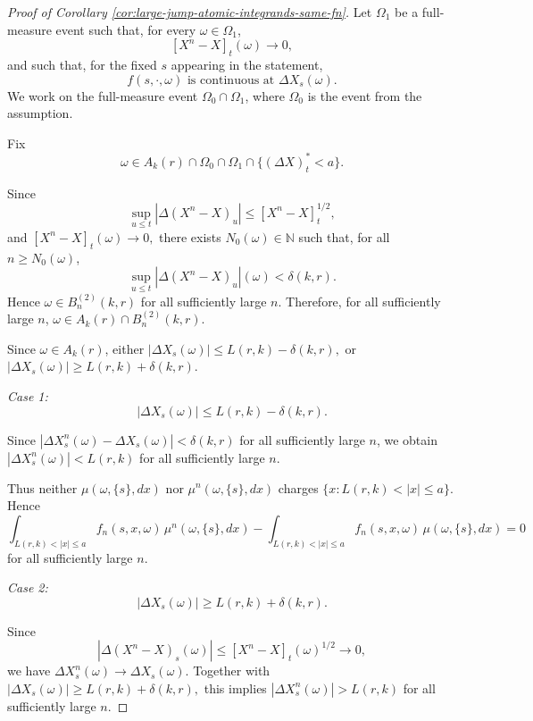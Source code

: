 \documentclass[a4paper,10pt]{article}
\begin{document}
\begin{proof}[Proof of Corollary \ref{cor:large-jump-atomic-integrands-same-fn}]
Let \(\Omega_1\) be a full-measure event such that, for every
\(\omega\in\Omega_1\),
\[
        [X^n-X]_t(\omega)\to0,
\]
and such that, for the fixed \(s\) appearing in the statement,
\[
        f(s,\cdot,\omega)
        \text{ is continuous at }\Delta X_s(\omega).
\]
We work on the full-measure event \(\Omega_0\cap\Omega_1\), where \(\Omega_0\)
is the event from the assumption.

Fix
\[
        \omega \in A_k(r)\cap \Omega_0\cap\Omega_1 \cap \{(\Delta X)^*_t<a\}.
\]

Since
\[
        \sup_{u\le t}|\Delta(X^{n}-X)_u|
        \le [X^{n}-X]_t^{1/2},
\]
and
$
        [X^{n}-X]_t(\omega)\to0,
$
there exists \(N_0(\omega)\in\mathbb N\) such that, for all
\(n\ge N_0(\omega)\),
\[
        \sup_{u\le t}
        |\Delta(X^{n}-X)_u|(\omega)
        <\delta(k,r).
\]
Hence
$
        \omega\in B_n^{(2)}(k,r)
$
for all sufficiently large \(n\). Therefore, for all sufficiently large
\(n\),
$
        \omega\in
        A_k(r)\cap B_n^{(2)}(k,r).
$

Since \(\omega\in A_k(r)\), either
$
        |\Delta X_s(\omega)|
        \le
        L(r,k)-\delta(k,r),
$
or
$
        |\Delta X_s(\omega)|
        \ge
        L(r,k)+\delta(k,r).
$

\medskip

\noindent

\textit{Case 1:}
\[
        |\Delta X_s(\omega)|
        \le
        L(r,k)-\delta(k,r).
\]

Since
$
|\Delta X^{n}_s(\omega)-\Delta X_s(\omega)|
<
\delta(k,r)
$
for all sufficiently large \(n\), we obtain
$
|\Delta X^{n}_s(\omega)|
<
L(r,k)
$
for all sufficiently large \(n\).

Thus neither \(\mu(\omega,\{s\},dx)\) nor
\(\mu^n(\omega,\{s\},dx)\) charges
$
        \{x:L(r,k)<|x|\le a\}.
$
Hence
\[
\int_{L(r,k)<|x|\le a}
f_{n}(s,x,\omega)\,
\mu^n(\omega,\{s\},dx)
-
\int_{L(r,k)<|x|\le a}
f_{n}(s,x,\omega)\,
\mu(\omega,\{s\},dx)
=0
\]
for all sufficiently large \(n\).
\medskip

\noindent
\textit{Case 2:}
\[
        |\Delta X_s(\omega)|
        \ge
        L(r,k)+\delta(k,r).
\]

Since
\[
|\Delta(X^{n}-X)_s(\omega)|
\le
[X^{n}-X]_t(\omega)^{1/2}
\to0,
\]
we have
$
\Delta X^{n}_s(\omega)\to\Delta X_s(\omega)
$.
Together with
$
|\Delta X_s(\omega)|\ge L(r,k)+\delta(k,r),
$
this implies
$
|\Delta X^{n}_s(\omega)|>L(r,k)
$
for all sufficiently large \(n\).




\end{proof}
\end{document}
